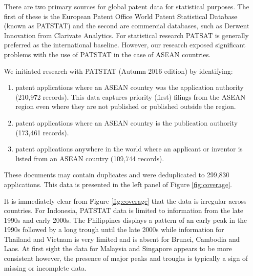 \documentclass[openany]{book}
\providecommand{\tightlist}{%
  \setlength{\itemsep}{0pt}\setlength{\parskip}{0pt}}
\theoremstyle{definition}
\theoremstyle{definition}
\theoremstyle{definition}
\theoremstyle{remark}
\begin{document}
There are two primary sources for global patent data for statistical
purposes. The first of these is the European Patent Office World Patent
Statistical Database (known as PATSTAT) and the second are commercial
databases, such as Derwent Innovation from Clarivate Analytics. For
statistical research PATSAT is generally preferred as the international
baseline. However, our research exposed significant problems with the
use of PATSTAT in the case of ASEAN countries.

We initiated research with PATSTAT (Autumn 2016 edition) by identifying:

\begin{enumerate}
\def\labelenumi{\alph{enumi})}
\tightlist
\item
  patent applications where an ASEAN country was the application
  authority (210,972 records). This data captures priority (first)
  filings from the ASEAN region even where they are not published or
  published outside the region.
\item
  patent applications where an ASEAN country is the publication
  authority (173,461 records).
\item
  patent applications anywhere in the world where an applicant or
  inventor is listed from an ASEAN country (109,744 records).
\end{enumerate}

These documents may contain duplicates and were deduplicated to 299,830
applications. This data is presented in the left panel of Figure
\ref{fig:coverage}.

It is immediately clear from Figure \ref{fig:coverage} that the data is
irregular across countries. For Indonesia, PATSTAT data is limited to
information from the late 1990s and early 2000s. The Philippines
displays a pattern of an early peak in the 1990s followed by a long
trough until the late 2000s while information for Thailand and Vietnam
is very limited and is absent for Brunei, Cambodia and Laos. At first
sight the data for Malaysia and Singapore appears to be more consistent
however, the presence of major peaks and troughs is typically a sign of
missing or incomplete data.
\end{document}
